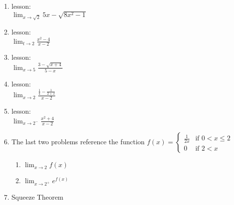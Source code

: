 \documentclass[11pt,fleqn]{article}
\begin{document}
\newpage
\begin{enumerate}
\item lesson:\\

$\displaystyle{\lim_{x \to \sqrt{2}} 5x -\sqrt{8x^2-1} }$
\vfill
\item lesson:\\

$\displaystyle{\lim_{t \to 2} \frac{x^2-4}{x-2} }$
\vfill
\item  lesson:\\

$\displaystyle{\lim_{x \to 5} \frac{3-\sqrt{x+4}}{5-x}}$
\vfill
\newpage
\item lesson:\\

$\displaystyle{\lim_{x \to 2} \frac{\frac{1}{4} - \frac{1}{2+x}}{x-2} }$
\vfill
\item lesson:\\

$\displaystyle{\lim_{x \to 2^-} \frac{x^2+4}{x-2} }$
\vfill
\item The last two problems reference the function $f(x) = \begin{cases} \frac{1}{2x} &\text{if } 0 < x \leq 2
\\ 0 &\text{if }  2<x \end{cases}$

\begin{enumerate}
\item $\displaystyle{\lim_{x \to 2} f(x)}$
\vfill
\item $\displaystyle{\lim_{x \to 2^+} e^{f(x)}}$
\end{enumerate}
\newpage
\item Squeeze Theorem
\end{enumerate}
\end{document}
